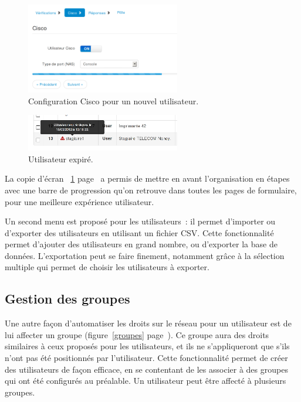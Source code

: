 \begin{figure}[!h]
	\begin{center}
	    \includegraphics[width=0.6\textwidth]{img/userscisco.png}
	\end{center}
	\caption{Configuration Cisco pour un nouvel utilisateur.}
	\label{userscisco}
\end{figure}

\begin{figure}[!h]
	\begin{center}
	    \includegraphics[width=0.6\textwidth]{img/usersexp.png}
	\end{center}
	\caption{Utilisateur expiré.}
	\label{usersexp}
\end{figure}

La copie d'écran ~\ref{userscisco} page~\pageref{userscisco} a permis de mettre en avant l'organisation en étapes avec une barre de progression qu'on retrouve dans toutes les pages de formulaire, pour une meilleure expérience utilisateur.

Un second menu est proposé pour les utilisateurs~: il permet d'importer ou d'exporter des utilisateurs en utilisant un fichier CSV. Cette fonctionnalité permet d'ajouter des utilisateurs en grand nombre, ou d'exporter la base de données. L'exportation peut se faire finement, notamment grâce à la sélection multiple qui permet de choisir les utilisateurs à exporter.

\subsection{Gestion des groupes}

Une autre façon d'automatiser les droits sur le réseau pour un utilisateur est de lui affecter un groupe (figure~\ref{groupes} page~\pageref{groupes}). Ce groupe aura des droits similaires à ceux proposés pour les utilisateurs, et ils ne s'appliqueront que s'ils n'ont pas été positionnés par l'utilisateur. Cette fonctionnalité permet de créer des utilisateurs de façon efficace, en se contentant de les associer à des groupes qui ont été configurés au préalable. Un utilisateur peut être affecté à plusieurs groupes.

